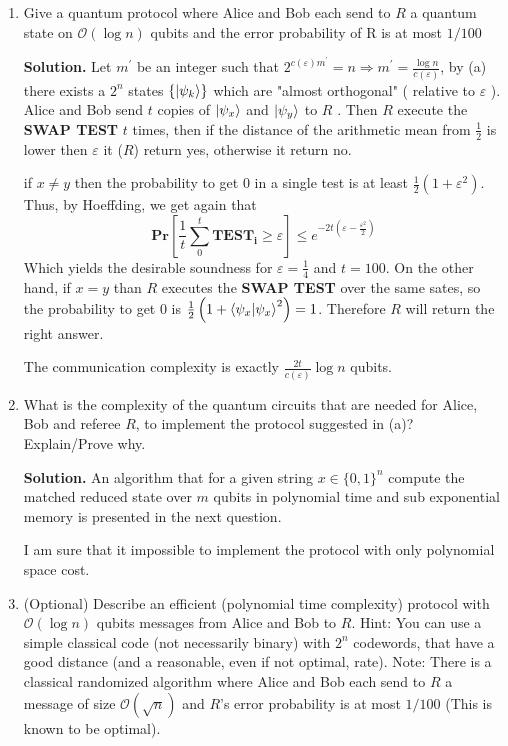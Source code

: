 \documentclass{article}
\newcommand{\onotation}[1]{\(\mathcal{O} \left( {#1}  \right) \)}
\newcommand{\ona}[1]{\onotation{#1}}
\begin{document}
\begin{enumerate}
    \item Give a quantum protocol where Alice and Bob each send to \(R\) a quantum state on \ona{ \log n}  qubits and the error probability of R is at most \( 1/100\) 
    
    
    \textbf{Solution.} Let \(m^\prime\) be an integer such that \( 2^{c(\varepsilon)m^\prime} = n \Rightarrow m^\prime = \frac{\log n}{c(\varepsilon)}\), by (a) there exists a \(2^n\) states \( \{ \ket{\psi_k} \} \) which are "almost orthogonal" ( relative to \(\varepsilon\) ). Alice and Bob send \(t\) copies of \( \ket{\psi_x} \) and \( \ket{\psi_y} \) to \(R\) . Then \(R\) execute the \textbf{SWAP TEST} \(t\) times, then if the distance of the arithmetic mean from \( \frac{1}{2} \) is lower then \(\varepsilon \) it (\(R\)) return yes, otherwise it return no.
    
    if \( x \neq y\) then the probability to get 0 in a single test is at least \( \frac{1}{2} \left( 1+ \varepsilon^2\right) \). Thus, by Hoeffding, we get again that \[ \mathbf{Pr} \left[ \frac{1}{t}\sum_{0}^{t}{ \mathbf{TEST_i} } \ge \varepsilon \right] \le e^{-2t\left( \varepsilon - \frac{\varepsilon^2}{2} \right)} \] Which yields the desirable soundness for \( \varepsilon = \frac{1}{4} \) and \( t = 100 \).   
    On the other hand, if \(x = y\) than \(R\) executes the \textbf{SWAP TEST} over the same sates, so the probability to get 0 is \(\frac{1}{2}\left(1 +  \braket{\psi_x | \psi_x}^2 \right) = 1\). Therefore \(R\) will return the right answer. 
    
    The communication complexity is exactly \( \frac{2t}{c(\varepsilon)}\log n\) qubits.
\item What is the complexity of the quantum circuits that are needed for Alice, Bob and referee \(R\), to implement the protocol suggested in (a)? Explain/Prove why.

\textbf{Solution.} An algorithm that for a given string \( x \in \{0,1\}^n \) compute the matched reduced state over \(m\) qubits in polynomial time and sub exponential memory is presented in the next question.

I am sure that it impossible to implement the protocol with only polynomial space cost.        

\item (Optional) Describe an efficient (polynomial time complexity) protocol with \ona{\log n} qubits messages from Alice and Bob to \(R\). Hint: You can use a simple classical code (not necessarily binary)
with \(2^n\) codewords, that have a good distance (and a reasonable, even if not optimal, rate). Note: There is a classical randomized algorithm where Alice and Bob each send to \(R\) a message of size \ona{\sqrt{n}}  and \(R\)’s error probability is at most \(1/100\) (This is known to be optimal).



\end{enumerate}
\end{document}

